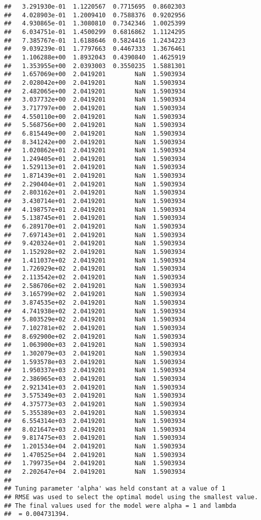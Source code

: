 \documentclass[]{article}
\begin{document}
\begin{verbatim}
##   3.291930e-01  1.1220567  0.7715695  0.8602303
##   4.028903e-01  1.2009410  0.7588376  0.9202956
##   4.930865e-01  1.3080810  0.7342346  1.0025399
##   6.034751e-01  1.4500299  0.6816862  1.1124295
##   7.385767e-01  1.6188646  0.5824416  1.2434223
##   9.039239e-01  1.7797663  0.4467333  1.3676461
##   1.106288e+00  1.8932043  0.4390840  1.4625919
##   1.353955e+00  2.0393003  0.3550235  1.5881301
##   1.657069e+00  2.0419201        NaN  1.5903934
##   2.028042e+00  2.0419201        NaN  1.5903934
##   2.482065e+00  2.0419201        NaN  1.5903934
##   3.037732e+00  2.0419201        NaN  1.5903934
##   3.717797e+00  2.0419201        NaN  1.5903934
##   4.550110e+00  2.0419201        NaN  1.5903934
##   5.568756e+00  2.0419201        NaN  1.5903934
##   6.815449e+00  2.0419201        NaN  1.5903934
##   8.341242e+00  2.0419201        NaN  1.5903934
##   1.020862e+01  2.0419201        NaN  1.5903934
##   1.249405e+01  2.0419201        NaN  1.5903934
##   1.529113e+01  2.0419201        NaN  1.5903934
##   1.871439e+01  2.0419201        NaN  1.5903934
##   2.290404e+01  2.0419201        NaN  1.5903934
##   2.803162e+01  2.0419201        NaN  1.5903934
##   3.430714e+01  2.0419201        NaN  1.5903934
##   4.198757e+01  2.0419201        NaN  1.5903934
##   5.138745e+01  2.0419201        NaN  1.5903934
##   6.289170e+01  2.0419201        NaN  1.5903934
##   7.697143e+01  2.0419201        NaN  1.5903934
##   9.420324e+01  2.0419201        NaN  1.5903934
##   1.152928e+02  2.0419201        NaN  1.5903934
##   1.411037e+02  2.0419201        NaN  1.5903934
##   1.726929e+02  2.0419201        NaN  1.5903934
##   2.113542e+02  2.0419201        NaN  1.5903934
##   2.586706e+02  2.0419201        NaN  1.5903934
##   3.165799e+02  2.0419201        NaN  1.5903934
##   3.874535e+02  2.0419201        NaN  1.5903934
##   4.741938e+02  2.0419201        NaN  1.5903934
##   5.803529e+02  2.0419201        NaN  1.5903934
##   7.102781e+02  2.0419201        NaN  1.5903934
##   8.692900e+02  2.0419201        NaN  1.5903934
##   1.063900e+03  2.0419201        NaN  1.5903934
##   1.302079e+03  2.0419201        NaN  1.5903934
##   1.593578e+03  2.0419201        NaN  1.5903934
##   1.950337e+03  2.0419201        NaN  1.5903934
##   2.386965e+03  2.0419201        NaN  1.5903934
##   2.921341e+03  2.0419201        NaN  1.5903934
##   3.575349e+03  2.0419201        NaN  1.5903934
##   4.375773e+03  2.0419201        NaN  1.5903934
##   5.355389e+03  2.0419201        NaN  1.5903934
##   6.554314e+03  2.0419201        NaN  1.5903934
##   8.021647e+03  2.0419201        NaN  1.5903934
##   9.817475e+03  2.0419201        NaN  1.5903934
##   1.201534e+04  2.0419201        NaN  1.5903934
##   1.470525e+04  2.0419201        NaN  1.5903934
##   1.799735e+04  2.0419201        NaN  1.5903934
##   2.202647e+04  2.0419201        NaN  1.5903934
## 
## Tuning parameter 'alpha' was held constant at a value of 1
## RMSE was used to select the optimal model using the smallest value.
## The final values used for the model were alpha = 1 and lambda
##  = 0.004731394.
\end{verbatim}
\end{document}
